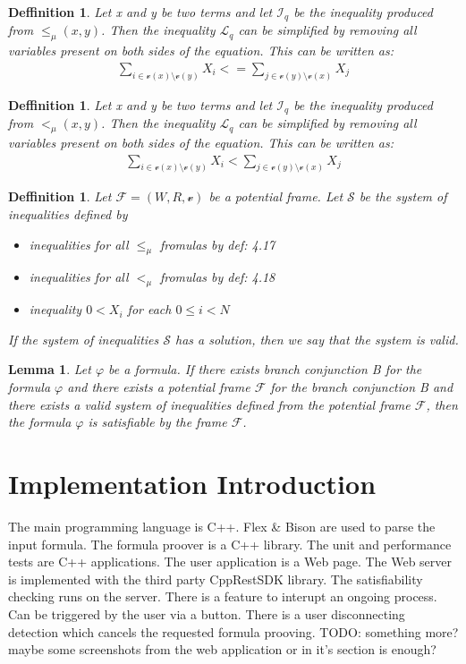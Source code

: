 \documentclass{article}
\newtheorem{defn}[theorem]{Deffinition}
\newtheorem{lemma}[theorem]{Lemma}
\newcommand{\vE}{\mathscr{v}}
\begin{document}
		\begin{defn}
			Let x and y be two terms and let $\mathscr{I}_q$ be the inequality produced from $\le_\mu(x, y)$. Then the inequality $\mathscr{L}_q$ can be simplified 
			by removing all variables present on both sides of the equation. This can be written as:
			\begin{align*}
				\sum_{i \in \vE(x) \setminus \vE(y)} X_i <= \sum_{j \in \vE(y) \setminus \vE(x)} X_j
			\end{align*}
		\end{defn}

		\begin{defn}
			Let x and y be two terms and let $\mathscr{I}_q$ be the inequality produced from $<_\mu(x, y)$. Then the inequality $\mathscr{L}_q$ can be simplified 
			by removing all variables present on both sides of the equation. This can be written as:
			\begin{align*}
				\sum_{i \in \vE(x) \setminus \vE(y)} X_i < \sum_{j \in \vE(y) \setminus \vE(x)} X_j
			\end{align*}
		\end{defn}

		\begin{defn}
			Let $\mathscr{F} = (W, R, \vE)$ be a potential frame. Let $\mathscr{S}$ be the system of inequalities defined by
			\begin{itemize}
				\item inequalities for all $\le_\mu$ fromulas by def: 4.17 
				\item inequalities for all $<_\mu$ fromulas by def: 4.18
				\item inequality $0 < X_i$ for each $0 \le i < N$  
			\end{itemize}
			If the system of inequalities $\mathscr{S}$ has a solution, then we say that the system is valid.
		\end{defn}
		\begin{lemma}
			Let $\varphi$ be a formula. If there exists branch conjunction B for the formula $\varphi$
			and there exists a potential frame $\mathscr{F}$ for the branch conjunction B and 
			there exists a valid system of inequalities defined from the potential frame $\mathscr{F}$,
			then the formula $\varphi$ is satisfiable by the frame $\mathscr{F}$.
		\end{lemma}

	\newpage
	\section{Implementation Introduction}
	The main programming language is C++. Flex \& Bison are used to parse the input formula. The formula proover is a C++ library. The unit and performance tests are C++ applications.
	The user application is a Web page. The Web server is implemented with the third party CppRestSDK library. The satisfiability checking runs on the server. There is a feature to interupt an ongoing process. Can be triggered by the user via a button. There is a user disconnecting detection which cancels the requested formula prooving.
	TODO: something more? maybe some screenshots from the web application or in it's section is enough?
		
\end{document}
